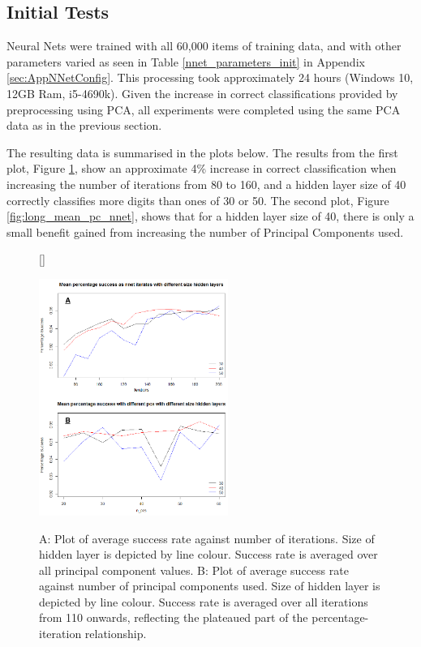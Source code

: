 \documentclass[11pt]{article} %
\begin{document}
\subsection{Initial Tests}


Neural Nets were trained with all 60,000 items of training data, and with other parameters varied as seen in Table \ref{nnet_parameters_init} in Appendix \ref{sec:AppNNetConfig}. This processing took approximately 24 hours (Windows 10, 12GB Ram, i5-4690k). Given the increase in correct classifications provided by preprocessing using PCA, all experiments were completed using the same PCA data as in the previous section.

The resulting data is summarised in the plots below. The results from the first plot, Figure \ref{fig:long_mean_nnet}, show an approximate 4\% increase in correct classification when increasing the number of iterations from 80 to 160, and a hidden layer size of 40 correctly classifies more digits than ones of 30 or 50. The second plot, Figure \ref{fig:long_mean_pc_nnet}, shows that for a hidden layer size of 40, there is only a small benefit gained from increasing the number of Principal Components used. 



\begin{figure}[htb!]
[\FBwidth]
{\caption{A: Plot of average success rate against number of iterations. Size of hidden layer is depicted by line colour. Success rate is averaged over all principal component values.
B: Plot of average success rate against number of principal components used. Size of hidden layer is depicted by line colour. Success rate is averaged over all iterations from 110 onwards, reflecting the plateaued part of the percentage-iteration relationship.}\label{fig:long_mean_nnet}}
{\includegraphics[width=0.55\textwidth]{long_mean_it_dupe.png}}
\end{figure}
\end{document}
